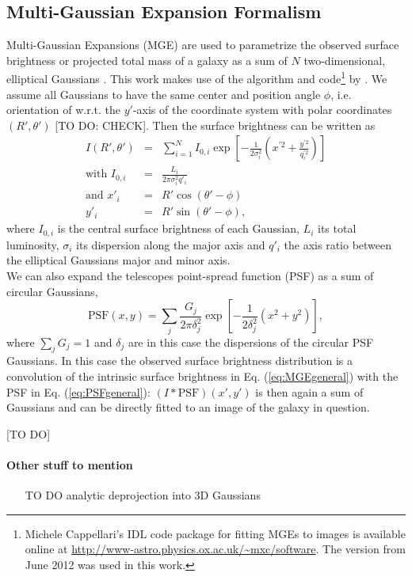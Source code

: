\subsection{Multi-Gaussian Expansion Formalism}

Multi-Gaussian Expansions (MGE) are used to parametrize the observed surface brightness or projected total mass of a galaxy as a sum of $N$ two-dimensional, elliptical Gaussians \citep{1991ApJ...366..599B,1992A&A...253..366M,1994A&A...285..723E,1999MNRAS.303..495E}. This work makes use of the algorithm and code\footnote{Michele Cappellari's IDL code package for fitting MGEs to images is available online at \url{http://www-astro.physics.ox.ac.uk/~mxc/software}. The version from June 2012 was used in this work.} by \citet{Cap02}. We assume all Gaussians to have the same center and position angle $\phi$, i.e. orientation of w.r.t. the $y'$-axis of the coordinate system with polar coordinates $(R',\theta')$ [TO DO: CHECK]. Then the surface brightness can be written as
\begin{eqnarray}
I(R',\theta') &=& \sum_{i=1}^{N} I_{0,i} \exp\left[ - \frac{1}{2\sigma_i^2} \left(x^{'2} + \frac{y^{'2}}{q_i^{'2}}\right)\right]\label{eq:MGEgeneral}\\
\text{with } I_{0,i} &=& \frac{L_i}{2\pi \sigma_i^2 q'_i}\nonumber\\%
\text{and } x'_i &=& R' \cos(\theta' - \phi)\nonumber\\
y'_i &=& R' \sin(\theta' - \phi),\nonumber
\end{eqnarray}
where $I_{0,i}$ is the central surface brightness of each Gaussian, $L_i$ its total luminosity, $\sigma_i$ its dispersion along the major axis and $q'_i$ the axis ratio between the elliptical Gaussians major and minor axis.
\\We can also expand the telescopes point-spread function (PSF) as a sum of circular Gaussians,
\begin{equation}
\text{PSF}(x,y) = \sum_j \frac{G_j}{2 \pi \delta_j^2} \exp\left[- \frac{1}{2 \delta_j^2} \left(x^2 + y^2 \right)\right], \label{eq:PSFgeneral}
\end{equation}
where $\sum_j G_j = 1$ and $\delta_j$ are in this case the dispersions of the circular PSF Gaussians. In this case the observed surface brightness distribution is a convolution of the intrinsic surface brightness in Eq. (\ref{eq:MGEgeneral}) with the PSF in Eq. (\ref{eq:PSFgeneral}): $(I \ast \text{PSF}) (x',y')$ is then again a sum of Gaussians and can be directly fitted to an image of the galaxy in question.

[TO DO]

\paragraph{Other stuff to mention}
\begin{itemize}
\item [TO DO] analytic deprojection into 3D Gaussians
\end{itemize}

